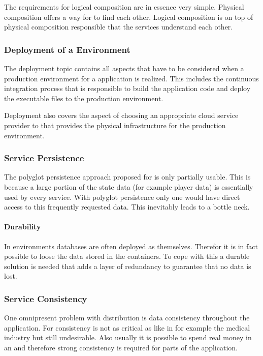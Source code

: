The requirements for logical composition are in essence very simple. Physical
composition offers a way for \mss{} to find each other. Logical composition is
on top of physical composition responsible that the services understand each
other.

\subsubsection{Deployment of a \ms{} Environment}

The deployment topic contains all aspects that have to be considered when a
production environment for a \ms{} application is realized. This includes the
continuous integration process that is responsible to build the application code
and deploy the executable files to the production environment.

Deployment also covers the aspect of choosing an appropriate cloud service
provider to that provides the physical infrastructure for the production
environment.

\subsubsection{Service Persistence}

The polyglot persistence approach proposed for \mss{} is only partially usable.
This is because a large portion of the state data (for example player data)
is essentially used by every service. With polyglot persistence only one
\ms{} would have direct access to this frequently requested data. This
inevitably leads to a bottle neck.

\paragraph{Durability}

In \ms{} environments databases are often deployed as \mss{} themselves.
Therefor it is in fact possible to loose the data stored in the containers. To
cope with this a durable solution is needed that adds a layer of redundancy to
guarantee that no data is lost. 

\subsubsection{Service Consistency}

One omnipresent problem with distribution is data consistency throughout the
application. For \ogs{} consistency is not as critical as like in for example
the medical industry but still undesirable. Also usually it is possible to spend
real money in an \og{} and therefore strong consistency is required for parts of
the application. 

